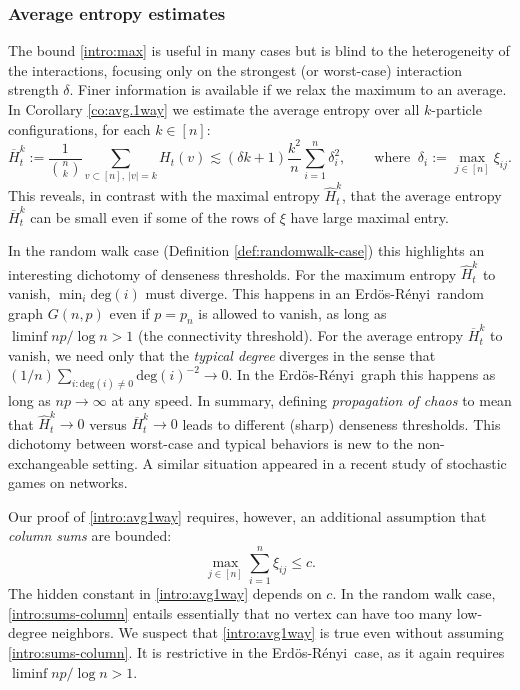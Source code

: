 \documentclass[11pt,reqno]{amsart}
\numberwithin{equation}{section}
\theoremstyle{definition}
\newcommand{\Erdos}{Erd\"{o}s-R\'enyi}
\begin{document}
\subsubsection{Average entropy estimates} 
The bound \eqref{intro:max} is useful in many cases but is blind to the heterogeneity of the interactions, focusing only on the strongest  (or worst-case) interaction strength $\delta$. Finer information is available if we relax the maximum to an average.
In Corollary \ref{co:avg.1way} we estimate the average entropy over all $k$-particle configurations, for each $k \in [n]$:
\begin{equation}
\overline{H}^k_t := \frac{1}{{n \choose k}}\sum_{v \subset [n], \ |v|=k} H_t(v) \lesssim (\delta k + 1)\frac{k^2}{n} \sum_{i=1}^n \delta_i^2, \qquad \text{where } \  \delta_i := \max_{j \in [n]}\xi_{ij}. \label{intro:avg1way}
\end{equation}
This reveals, in contrast with the maximal entropy $\widehat{H}^k_t$, that the average entropy $\overline{H}^k_t$ can be small even if  some of the rows of $\xi$ have large maximal entry. 

In the random walk case (Definition \ref{def:randomwalk-case}) this highlights an interesting  dichotomy of denseness thresholds. For the maximum entropy $\widehat{H}^k_t$ to vanish, $\min_i\mathrm{deg}(i)$ must diverge. 
This happens in an \Erdos\ random graph $G(n,p)$ even if $p=p_n$ is allowed to vanish, as long as $\liminf np/\log n > 1$ (the connectivity threshold). 
For the average entropy $\overline{H}^k_t$ to vanish, we need only that the \emph{typical degree} diverges in the sense that $(1/n)\sum_{i:\mathrm{deg}(i) \neq 0} \mathrm{deg}(i)^{-2} \to 0$. In the \Erdos\ graph this happens as long as $np \to \infty$ at any speed.  In summary, defining \emph{propagation of chaos} to mean that $\widehat{H}^k_t \to 0$ versus $\overline{H}^k_t \to 0$ leads to different (sharp) denseness thresholds.
This dichotomy between worst-case and typical behaviors is new to the non-exchangeable setting. A similar situation appeared in a recent study \cite[Section 2.3.1]{lacker2022case} of stochastic games on networks.

Our proof of \eqref{intro:avg1way} requires, however, an additional assumption that \emph{column sums} are bounded:
\begin{equation}
\max_{j \in [n]}\sum_{i=1}^n\xi_{ij} \le c. \label{intro:sums-column}
\end{equation}
The hidden constant in \eqref{intro:avg1way} depends on $c$. In the random walk case, \eqref{intro:sums-column} entails essentially that no vertex can have too many low-degree neighbors. 
We suspect that \eqref{intro:avg1way} is true even without assuming \eqref{intro:sums-column}. It is restrictive in the \Erdos \ case, as it again requires $\liminf np/\log n > 1$.
\end{document}
